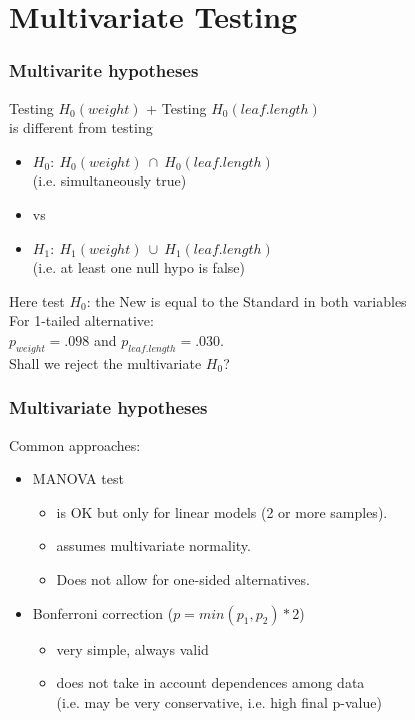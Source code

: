 \documentclass[xcolor={pdftex,dvipsnames,table}]{beamer}
\newcommand{\bi}{\begin {itemize}}
\newcommand{\ei}{\end{itemize}}
\newcommand{\bfr}[1]{\begin{frame} \frametitle{#1}}
\newcommand{\gbf}[1]{\textcolor{grayUnipd}{#1}}
\begin{document}
\section{Multivariate Testing}

\bfr{Multivarite hypotheses}
Testing $H_0(weight)$ + Testing $H_0(leaf.length)$\\
is different from testing
\bi
\item $H_0:\ H_0(weight)\ \cap \ H_0(leaf.length)$\\ (i.e. simultaneously true)
\item[] vs
\item $H_1:\ H_1(weight)\ \cup \ H_1(leaf.length)$\\
(i.e. at least one null hypo is false)
\ei
Here test $H_0$: the New is equal to the Standard in \gbf{both variables}\\
For 1-tailed alternative:\\ $p_{weight}=.098$ and $p_{leaf.length}=.030$. \\
Shall we reject the multivariate $H_0$?
\end{frame}

\bfr{Multivariate hypotheses}
Common approaches:
\bi
\item MANOVA test 
\bi
 \item[] is OK but only for linear models (2 or more samples).
 \item[] assumes multivariate normality.
 \item[] Does not allow for one-sided alternatives.
 \ei
\item Bonferroni correction ($p=min(p_1,p_2)*2$)
\bi
\item[] very simple, always valid
\item[] does not take in account dependences among data\\ (i.e. may be very conservative, i.e. high final p-value)
\ei
\ei
\end{frame}
\end{document}

